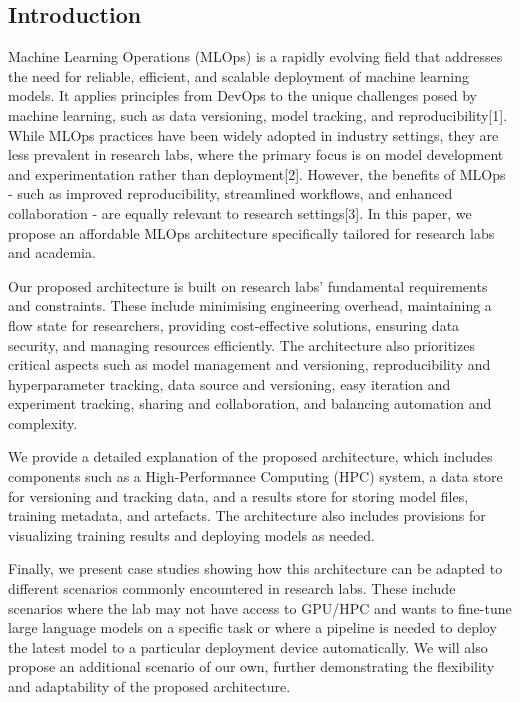 \subsection{Introduction \label{introduction}}

Machine Learning Operations (MLOps) is a rapidly evolving field that addresses the need for reliable, efficient, and scalable deployment of machine learning models. It applies principles from DevOps to the unique challenges posed by machine learning, such as data versioning, model tracking, and reproducibility[1]. While MLOps practices have been widely adopted in industry settings, they are less prevalent in research labs, where the primary focus is on model development and experimentation rather than deployment[2]. However, the benefits of MLOps - such as improved reproducibility, streamlined workflows, and enhanced collaboration - are equally relevant to research settings[3]. In this paper, we propose an affordable MLOps architecture specifically tailored for research labs and academia.


Our proposed architecture is built on research labs' fundamental requirements and constraints. These include minimising engineering overhead, maintaining a flow state for researchers, providing cost-effective solutions, ensuring data security, and managing resources efficiently. The architecture also prioritizes critical aspects such as model management and versioning, reproducibility and hyperparameter tracking, data source and versioning, easy iteration and experiment tracking, sharing and collaboration, and balancing automation and complexity.

We provide a detailed explanation of the proposed architecture, which includes components such as a High-Performance Computing (HPC) system, a data store for versioning and tracking data, and a results store for storing model files, training metadata, and artefacts. The architecture also includes provisions for visualizing training results and deploying models as needed.


Finally, we present case studies showing how this architecture can be adapted to different scenarios commonly encountered in research labs. These include scenarios where the lab may not have access to GPU/HPC and wants to fine-tune large language models on a specific task or where a pipeline is needed to deploy the latest model to a particular deployment device automatically. We will also propose an additional scenario of our own, further demonstrating the flexibility and adaptability of the proposed architecture.

